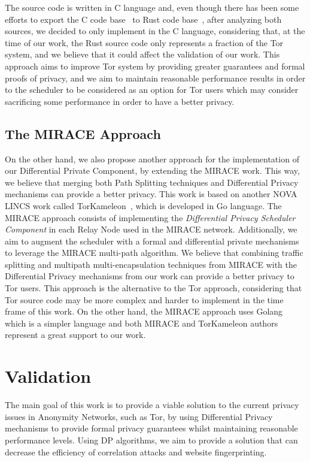The source code is written in C language and, even though there has been some efforts to export the C code base~\cite{TorRepo} to Rust code base~\cite{TorRustRepo}, after analyzing both sources, we decided to only implement in the C language, considering that, at the time of our work, the Rust source code only represents a fraction of the Tor system, and we believe that it could affect the validation of our work.
This approach aims to improve Tor system by providing greater guarantees and formal proofs of privacy, and we aim to maintain reasonable performance results in order to the scheduler to be considered as an option for Tor users which may consider sacrificing some performance in order to have a better privacy. 

\subsection{The MIRACE Approach}\label{subsec:mirace_approach}

On the other hand, we also propose another approach for the implementation of our Differential Private Component, by extending the MIRACE work. This way, we believe that merging both Path Splitting techniques and Differential Privacy mechanisms can provide a better privacy. This work is based on another NOVA LINCS work called TorKameleon~\cite{TorKameleon}, which is developed in Go language. The MIRACE approach consists of implementing the \textit{Differential Privacy Scheduler Component} in each Relay Node used in the MIRACE network. Additionally, we aim to augment the scheduler with a formal and differential private mechanisms to leverage the MIRACE multi-path algorithm. We believe that combining traffic splitting and multipath multi-encapsulation techniques from MIRACE with the Differential Privacy mechanisms from our work can provide a better privacy to Tor users.
This approach is the alternative to the Tor approach, considering that Tor source code may be more complex and harder to implement in the time frame of this work. On the other hand, the MIRACE approach uses Golang which is a simpler language and both MIRACE and TorKameleon authors represent a great support to our work.

\section{Validation}\label{sec:validation}

The main goal of this work is to provide a viable solution to the current privacy issues in Anonymity Networks, such as Tor, by using Differential Privacy mechanisms to provide formal privacy guarantees whilst maintaining reasonable performance levels. Using DP algorithms, we aim to provide a solution that can decrease the efficiency of correlation attacks and website fingerprinting.

